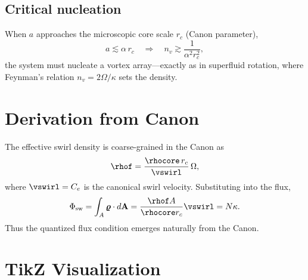 \documentclass[11pt,a4paper]{article}
\begin{document}
    \subsection*{Critical nucleation}
        When $a$ approaches the microscopic core scale $r_c$ (Canon parameter),
        \begin{equation}
        a \lesssim \alpha\,r_c \quad \Longrightarrow \quad
        n_v \gtrsim \frac{1}{\alpha^2 r_c^2},
        \end{equation}
        the system must nucleate a vortex array---exactly as in superfluid rotation, where Feynman's relation $n_v=2\Omega/\kappa$ sets the density.

\section{Derivation from Canon}
    The effective swirl density is coarse-grained in the Canon as
    \begin{equation}
    \rhof = \frac{\rhocore\,r_c}{\vswirl}\,\Omega,
    \end{equation}
    where $\vswirl=C_e$ is the canonical swirl velocity. Substituting into the flux,
    \begin{equation}
    \Phi_{\rm sw} = \int_A \bm{\varrho}\cdot d\mathbf A
    = \frac{\rhof A}{\rhocore r_c} \vswirl
    = N\kappa.
    \end{equation}
    Thus the quantized flux condition emerges naturally from the Canon.

\section{TikZ Visualization}
    \begin{center}
    \end{center}
\end{document}
